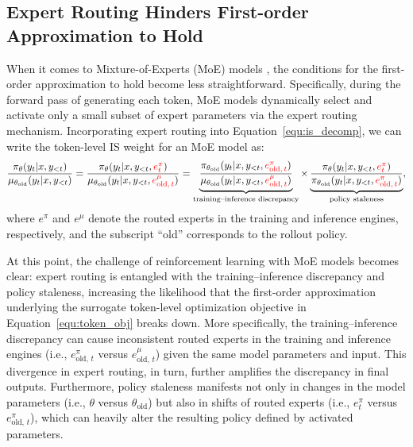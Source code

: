 \documentclass{article}
\begin{document}
\subsection{Expert Routing Hinders First-order Approximation to Hold}

When it comes to Mixture-of-Experts (MoE) models \citep{dpsk-r1,qwen3}, the conditions for the first-order approximation to hold become less straightforward.
Specifically, during the forward pass of generating each token, MoE models dynamically select and activate only a small subset of expert parameters via the expert routing mechanism.
Incorporating expert routing into Equation~\eqref{equ:is_decomp}, we can write the token-level IS weight for an MoE model as:
\begin{align}
\label{equ:is_decomp_moe}
\frac{ \pi_\theta ( y_t | x, y_{<t} ) }{ \mu_{ \theta_\text{old} } ( y_t | x, y_{<t} ) }
=
\frac{ \pi_\theta ( y_t | x, y_{<t}, \textcolor{red}{ e^{ \pi }_t } ) }{ \mu_{ \theta_\text{old} } ( y_t | x, y_{<t}, \textcolor{red}{ e^{ \mu }_{ \text{old}, \, t } } ) }
=
\underbrace{
    \frac{ \pi_{ \theta_\text{old} } ( y_t | x, y_{<t}, \textcolor{red}{ e^{ \pi }_{ \text{old}, \, t } } ) }{ \mu_{ \theta_\text{old} } ( y_t | x, y_{<t}, \textcolor{red}{ e^{ \mu }_{ \text{old}, \, t } } ) } 
}_\text{training–inference discrepancy}
\times 
\underbrace{
\frac{ \pi_\theta ( y_t | x, y_{<t}, \textcolor{red}{ e^{ \pi }_t } ) }{ \pi_{ \theta_\text{old} } ( y_t | x, y_{<t}, \textcolor{red}{ e^{ \pi }_{ \text{old}, \, t } } ) }
}_\text{policy staleness},
\end{align}
where \( e^{ \pi } \) and \( e^{ \mu } \) denote the routed experts in the training and inference engines, respectively, and the subscript ``old'' corresponds to the rollout policy.

At this point, the challenge of reinforcement learning with MoE models becomes clear: {expert routing is entangled with the training–inference discrepancy and policy staleness, increasing the likelihood that the first-order approximation underlying the surrogate token-level optimization objective in Equation~\eqref{equ:token_obj} breaks down}.
More specifically, the training–inference discrepancy can cause inconsistent routed experts in the training and inference engines (i.e., \( e^{ \pi }_{ \text{old}, \, t } \) versus \( e^{ \mu }_{ \text{old}, \, t } \)) given the same model parameters and input.
This divergence in expert routing, in turn, further amplifies the discrepancy in final outputs.
Furthermore, policy staleness manifests not only in changes in the model parameters (i.e., \( \theta \) versus \( \theta_\text{old} \)) but also in shifts of routed experts (i.e., \( e^{ \pi }_t \) versus \( e^{ \pi }_{ \text{old}, \, t } \)), which can heavily alter the resulting policy defined by activated parameters.
\end{document}
